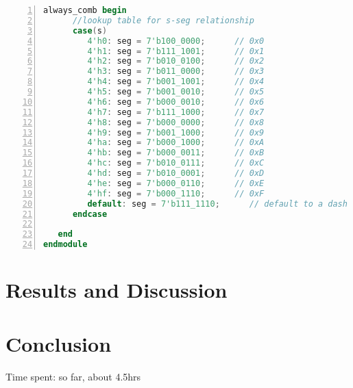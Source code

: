 \documentclass[11pt]{article}
\begin{document}
\begin{lstlisting}[language=Verilog,numbers=left,basicstyle=\footnotesize]
   always_comb begin
      //lookup table for s-seg relationship
      case(s)
         4'h0: seg = 7'b100_0000;      // 0x0
         4'h1: seg = 7'b111_1001;      // 0x1
         4'h2: seg = 7'b010_0100;      // 0x2
         4'h3: seg = 7'b011_0000;      // 0x3
         4'h4: seg = 7'b001_1001;      // 0x4
         4'h5: seg = 7'b001_0010;      // 0x5
         4'h6: seg = 7'b000_0010;      // 0x6
         4'h7: seg = 7'b111_1000;      // 0x7
         4'h8: seg = 7'b000_0000;      // 0x8
         4'h9: seg = 7'b001_1000;      // 0x9
         4'ha: seg = 7'b000_1000;      // 0xA
         4'hb: seg = 7'b000_0011;      // 0xB
         4'hc: seg = 7'b010_0111;      // 0xC
         4'hd: seg = 7'b010_0001;      // 0xD
         4'he: seg = 7'b000_0110;      // 0xE
         4'hf: seg = 7'b000_1110;      // 0xF
         default: seg = 7'b111_1110;      // default to a dash
      endcase
      
   end
endmodule

\end{lstlisting}


\clearpage

\section{Results and Discussion}




\section{Conclusion}


Time spent: so far, about 4.5hrs
\end{document}
